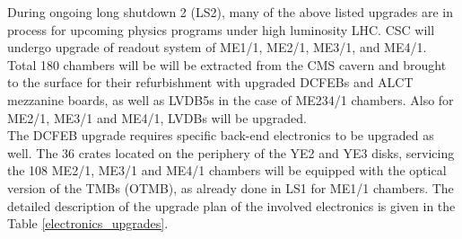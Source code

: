 During ongoing long shutdown 2 (LS2), many of the above listed upgrades are in process for upcoming physics programs under high luminosity LHC.
CSC will undergo upgrade of readout system of ME1/1, ME2/1, ME3/1, and ME4/1. Total 180 chambers will be will be extracted from the CMS cavern and brought to the surface for their refurbishment with
upgraded DCFEBs and ALCT mezzanine boards, as well as LVDB5s in the case of ME234/1
chambers. Also for ME2/1, ME3/1 and ME4/1, LVDBs will be upgraded.\\
The DCFEB upgrade requires specific back-end electronics to be upgraded as well. The 36
crates located on the periphery of the YE2 and YE3 disks, servicing the 108 ME2/1, ME3/1 and
ME4/1 chambers will be equipped with the optical version of the TMBs (OTMB), as already
done in LS1 for ME1/1 chambers.
The detailed description of the upgrade plan of the involved electronics is given in the Table \ref{electronics_upgrades}.
